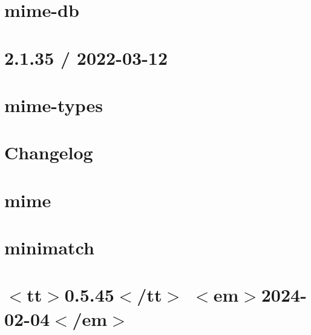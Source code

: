 \documentclass[twoside]{book}
\newcommand{\+}{\discretionary{\mbox{\scriptsize$\hookleftarrow$}}{}{}}
\begin{document}
\chapter{mime-\/db}
\label{md_Backend_nodejs_node_modules_mime_db_README}

\chapter{2.1.35 / 2022-\/03-\/12}
\label{md_Backend_nodejs_node_modules_mime_types_HISTORY}

\chapter{mime-\/types}
\label{md_Backend_nodejs_node_modules_mime_types_README}

\chapter{Changelog}
\label{md_Backend_nodejs_node_modules_mime_CHANGELOG}

\chapter{mime}
\label{md_Backend_nodejs_node_modules_mime_README}

\chapter{minimatch}
\label{md_Backend_nodejs_node_modules_minimatch_README}

\chapter{\texorpdfstring{$<$}{<}tt\texorpdfstring{$>$}{>}0.5.45\texorpdfstring{$<$}{<}/tt\texorpdfstring{$>$}{>} \texorpdfstring{$<$}{<}em\texorpdfstring{$>$}{>}2024-\/02-\/04\texorpdfstring{$<$}{<}/em\texorpdfstring{$>$}{>}}
\label{md_Backend_nodejs_node_modules_moment_timezone_changelog}

\end{document}
